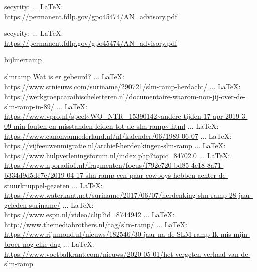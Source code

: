 \begin{thebibliography}{99}
{{{{{{{	
	secyrity:
	 ... \LaTeX:\\ \url{https://permanent.fdlp.gov/gpo45474/AN_advisory.pdf}
	
	
	secyrity:
	 ... \LaTeX:\\ \url{https://permanent.fdlp.gov/gpo45474/AN_advisory.pdf}
	
	
	
	
	
	
	
	
	bijlmerramp
	
	
	
	
	slmramp
	Wat is er gebeurd?
	 ... \LaTeX:\\ \url{https://www.srnieuws.com/suriname/290721/slm-ramp-herdacht/}
	 ... \LaTeX:\\ \url{https://werkgroepcaraibischeletteren.nl/documentaire-waarom-nou-jij-over-de-slm-ramp-in-89/}
	 ... \LaTeX:\\ \url{https://www.vpro.nl/speel~WO_NTR_15390142~andere-tijden-17-apr-2019-3-09-min-fouten-en-misstanden-leiden-tot-de-slm-ramp~.html}
	 ... \LaTeX:\\ \url{https://www.canonvannederland.nl/nl/kalender/06/1989-06-07}
	 ... \LaTeX:\\ \url{https://vijfeeuwenmigratie.nl/archief-herdenkingen-slm-ramp}
	 ... \LaTeX:\\ \url{https://www.hulpverleningsforum.nl/index.php?topic=84702.0}
	 ... \LaTeX:\\ \url{https://www.nporadio1.nl/fragmenten/focus/f792e720-bd85-4c18-8a71-b334d9d5de7e/2019-04-17-slm-ramp-een-paar-cowboys-hebben-achter-de-stuurknuppel-gezeten}
	 ... \LaTeX:\\ \url{https://www.waterkant.net/suriname/2017/06/07/herdenking-slm-ramp-28-jaar-geleden-suriname/}
	 ... \LaTeX:\\ \url{https://www.espn.nl/video/clip?id=8744942}
	 ... \LaTeX:\\ \url{http://www.themediabrothers.nl/tag/slm-ramp/}
	 ... \LaTeX:\\ \url{https://www.rijnmond.nl/nieuws/182546/30-jaar-na-de-SLM-ramp-Ik-mis-mijn-broer-nog-elke-dag}
	 ... \LaTeX:\\ \url{https://www.voetbalkrant.com/nieuws/2020-05-01/het-vergeten-verhaal-van-de-slm-ramp}
}}}}}}}
\end{thebibliography}
